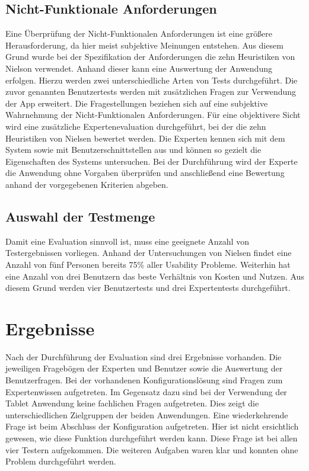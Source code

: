 \subsection{Nicht-Funktionale Anforderungen}
Eine Überprüfung der Nicht-Funktionalen Anforderungen ist eine größere Herausforderung, da hier meist subjektive Meinungen entstehen. Aus diesem Grund wurde bei der Spezifikation der Anforderungen die zehn Heuristiken von Nielson verwendet. Anhand dieser kann eine Auswertung der Anwendung erfolgen. Hierzu werden zwei unterschiedliche Arten von Tests durchgeführt. Die zuvor genannten Benutzertests werden mit zusätzlichen Fragen zur Verwendung der App erweitert. Die Fragestellungen beziehen sich auf eine subjektive Wahrnehmung der Nicht-Funktionalen Anforderungen. Für eine objektivere Sicht wird eine zusätzliche Expertenevaluation durchgeführt, bei der die zehn Heuristiken von Nielsen bewertet werden. Die Experten kennen sich mit dem System sowie mit Benutzerschnittstellen aus und können so gezielt die Eigenschaften des Systems untersuchen. Bei der Durchführung wird der Experte die Anwendung ohne Vorgaben überprüfen und anschließend eine Bewertung anhand der vorgegebenen Kriterien abgeben. 

\subsection{Auswahl der Testmenge}
Damit eine Evaluation sinnvoll ist, muss eine geeignete Anzahl von Testergebnissen vorliegen. Anhand der Untersuchungen von Nielsen \cite{bib:countTests} findet eine Anzahl von fünf Personen bereits 75\% aller Usability Probleme. Weiterhin hat eine Anzahl von drei Benutzern das beste Verhältnis von Kosten und Nutzen. Aus diesem Grund werden vier Benutzertests und drei Expertentests durchgeführt. 

\section{Ergebnisse}
Nach der Durchführung der Evaluation sind drei Ergebnisse vorhanden. Die jeweiligen Fragebögen der Experten und Benutzer sowie die Auswertung der Benutzerfragen. Bei der vorhandenen Konfigurationslösung sind Fragen zum Expertenwissen aufgetreten. Im Gegensatz dazu sind bei der Verwendung der Tablet Anwendung keine fachlichen Fragen aufgetreten. Dies zeigt die unterschiedlichen Zielgruppen der beiden Anwendungen. Eine wiederkehrende Frage ist beim Abschluss der Konfiguration aufgetreten. Hier ist nicht ersichtlich gewesen, wie diese Funktion durchgeführt werden kann. Diese Frage ist bei allen vier Testern aufgekommen. Die weiteren Aufgaben waren klar und konnten ohne Problem durchgeführt werden. 


